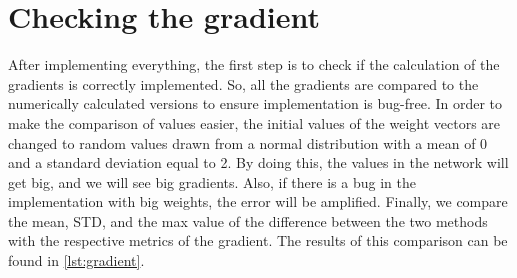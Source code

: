 \documentclass[a4paper]{article}
\begin{document}
\section{Checking the gradient}

After implementing everything, the first step is to check if the calculation of the gradients is correctly implemented. So, all the gradients are compared to the numerically calculated versions to ensure implementation is bug-free. In order to make the comparison of values easier, the initial values of the weight vectors are changed to random values drawn from a normal distribution with a mean of 0 and a standard deviation equal to 2. By doing this, the values in the network will get big, and we will see big gradients. Also, if there is a bug in the implementation with big weights, the error will be amplified. Finally, we compare the mean, STD, and the max value of the difference between the two methods with the respective metrics of the gradient. The results of this comparison can be found in \autoref{lst:gradient}.
\end{document}
